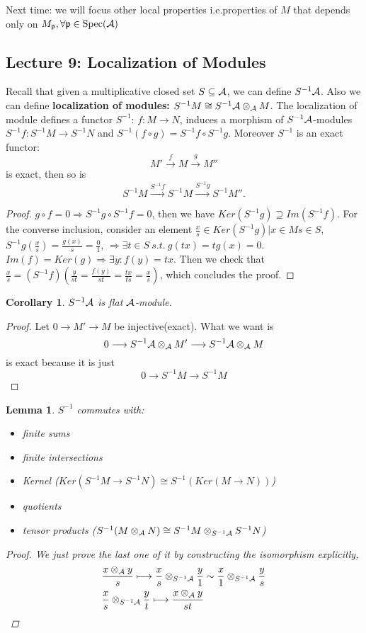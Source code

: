 \documentclass[11pt]{article}
\newtheorem{lemma}[thm]{Lemma}
\newtheorem{cor}[thm]{Corollary}
\newcommand{\scp}{{\mathfrak p}}
\newcommand{\cala}{{\cal A}}
\newcommand{\Lrta}{\Longrightarrow}
\newcommand{\lrta}{\longrightarrow}
\begin{document}
Next time: we will focus other local properties i.e.properties of $M$ that depends only on  $M_\scp, \forall \scp\in \text{Spec}(\cala)$



\subsection{Lecture 9: Localization of Modules}
Recall that given a multiplicative closed set 
$S\subseteq \cala$, we can define  $S^{-1}\cala$.
Also we can define \textbf{localization of modules:} $S^{-1}M\cong S^{-1}\cala\otimes_\cala M$. The localization of module defines a functor $S^{-1}$:
$f:M\lrta N$, induces a morphism of $S^{-1}\cala$-modules $S^{-1}f:S^{-1}M\lrta S^{-1}N$ and $S^{-1}(f\circ g)=S^{-1}f\circ S^{-1}g$. Moreover $S^{-1}$ is an exact functor:
$$
M'\overset{f}{\lrta}M\overset{g}{\lrta}M''
$$
is exact, then so is 
$$
S^{-1}M\overset{S^{-1}f}{\lrta }S^{-1}M\overset{S^{-1}g}{\lrta } S^{-1}M''.
$$

\begin{proof}
$g\circ f=0\Lrta S^{-1}g\circ S^{-1}f=0$, then we have $Ker(S^{-1}g)\supseteq Im(S^{-1}f)$. For the converse inclusion, consider an element $\frac{x}{s}\in Ker(S^{-1}g)|x\in M s\in S$, $S^{-1}g(\frac{x}{s})=\frac{g(x)}{s}=\frac{0}{1}$, $\Lrta \exists t\in S\ s.t. \ g(tx)=tg(x)=0$. $Im(f)=Ker(g)\Lrta\exists y: f(y)=tx$. Then we check that $\frac{x}{s}=(S^{-1}f)(\frac{y}{st}=\frac{f(y)}{st}=\frac{tx}{ts}=\frac{x}{s})$, which concludes the proof.
\end{proof}

\begin{cor}
$S^{-1}\cala$ is flat $\cala$-module.
\end{cor}
\begin{proof}
Let $0\lrta M'\lrta M$ be injective(exact). What we want is 
$$
0\lrta S^{-1}\cala\otimes_\cala M'\lrta S^{-1
}\cala\otimes _\cala M
$$
is exact because it is just 
$$
0\lrta S^{-1}M\lrta S^{-1}M
$$
\end{proof}

\begin{lemma}
$S^{-1} $ commutes with:
\begin{itemize}
\item finite sums 
\item finite intersections
\item Kernel ($Ker(S^{-1}M\lrta S^{-1}N)\cong S^{-1}(Ker(M\lrta N))$)
\item quotients 
\item tensor products ($S^{-1}(M\otimes_\cala N)\cong S^{-1} M\otimes_{S^{-1}\cala}S^{-1}N$)
\end{itemize} 
\begin{proof}
We just prove the last one of it by constructing the isomorphism explicitly,
$$
\begin{aligned}
&\frac{x\otimes_\cala y}{s}\longmapsto \frac{x}{s}\otimes_{S^{-1}\cala}\frac{y}{1}\sim \frac{x}{1}\otimes_{S^{-1}\cala}\frac{y}{s}\\
&\frac{x}{s}\otimes_{S^{-1}\cala}\frac{y}{t}\longmapsto \frac{x\otimes_\cala y}{s t} 
\end{aligned}
$$
\end{proof}
\end{lemma}
\end{document}
